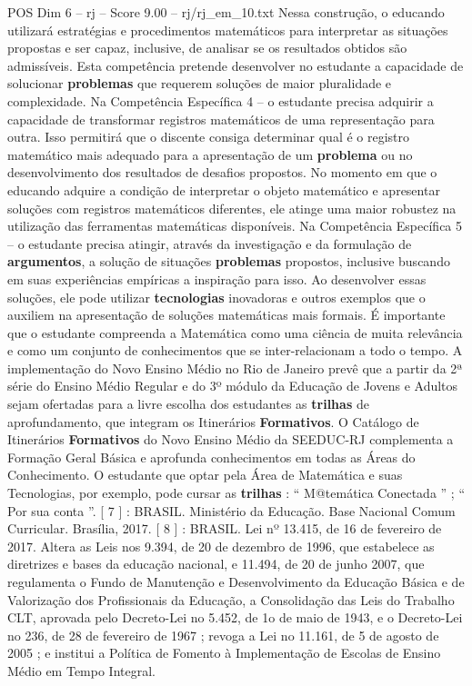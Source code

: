 \begin{textsample}{POS Dim 6 – rj – Score 9.00 – rj/rj\_em\_10.txt}
Nessa construção, o educando utilizará estratégias e procedimentos matemáticos para interpretar as situações propostas e ser capaz, inclusive, de analisar se os resultados obtidos são admissíveis.
Esta competência pretende desenvolver no estudante a capacidade de solucionar \textbf{problemas} que requerem soluções de maior pluralidade e complexidade.
Na Competência Específica 4 – o estudante precisa adquirir a capacidade de transformar registros matemáticos de uma representação para outra.
Isso permitirá que o discente consiga determinar qual é o registro matemático mais adequado para a apresentação de um \textbf{problema} ou no desenvolvimento dos resultados de desafios propostos.
No momento em que o educando adquire a condição de interpretar o objeto matemático e apresentar soluções com registros matemáticos diferentes, ele atinge uma maior robustez na utilização das ferramentas matemáticas disponíveis.
Na Competência Específica 5 – o estudante precisa atingir, através da investigação e da formulação de \textbf{argumentos}, a solução de situações \textbf{problemas} propostos, inclusive buscando em suas experiências empíricas a inspiração para isso.
Ao desenvolver essas soluções, ele pode utilizar \textbf{tecnologias} inovadoras e outros exemplos que o auxiliem na apresentação de soluções matemáticas mais formais.
É importante que o estudante compreenda a Matemática como uma ciência de muita relevância e como um conjunto de conhecimentos que se inter-relacionam a todo o tempo.
A implementação do Novo Ensino Médio no Rio de Janeiro prevê que a partir da 2ª série do Ensino Médio Regular e do 3º módulo da Educação de Jovens e Adultos sejam ofertadas para a livre escolha dos estudantes as \textbf{trilhas} de aprofundamento, que integram os Itinerários \textbf{Formativos}.
O Catálogo de Itinerários \textbf{Formativos} do Novo Ensino Médio da SEEDUC-RJ complementa a Formação Geral Básica e aprofunda conhecimentos em todas as Áreas do Conhecimento.
O estudante que optar pela Área de Matemática e suas Tecnologias, por exemplo, pode cursar as \textbf{trilhas} : “ M@temática Conectada ” ; “ Por sua conta ”. [ 7 ] : BRASIL.
Ministério da Educação.
Base Nacional Comum Curricular.
Brasília, 2017. [ 8 ] : BRASIL.
Lei nº 13.415, de 16 de fevereiro de 2017.
Altera as Leis nos 9.394, de 20 de dezembro de 1996, que estabelece as diretrizes e bases da educação nacional, e 11.494, de 20 de junho 2007, que regulamenta o Fundo de Manutenção e Desenvolvimento da Educação Básica e de Valorização dos Profissionais da Educação, a Consolidação das Leis do Trabalho CLT, aprovada pelo Decreto-Lei no 5.452, de 1o de maio de 1943, e o Decreto-Lei no 236, de 28 de fevereiro de 1967 ; revoga a Lei no 11.161, de 5 de agosto de 2005 ; e institui a Política de Fomento à Implementação de Escolas de Ensino Médio em Tempo Integral.

\end{textsample}
